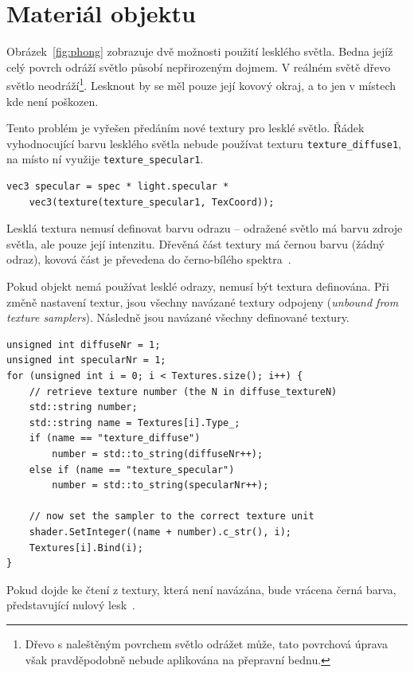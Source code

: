 \documentclass[thesis=M,czech]{FITthesis}[2019/12/23]
\begin{document}
\section{Materiál objektu}

Obrázek~\ref{fig:phong} zobrazuje dvě možnosti použití lesklého světla. Bedna jejíž celý povrch odráží světlo působí nepřirozeným dojmem. V reálném světě dřevo světlo neodráží\footnote{Dřevo s naleštěným povrchem světlo odrážet může, tato povrchová úprava však pravděpodobně nebude aplikována na přepravní bednu.}. Lesknout by se měl pouze její kovový okraj, a to jen v místech kde není poškozen.

Tento problém je vyřešen předáním nové textury pro lesklé světlo. Řádek vyhodnocující barvu lesklého světla nebude používat texturu \texttt{texture\_diffuse1}, na místo ní využije \texttt{texture\_specular1}.

\begin{verbatim}
vec3 specular = spec * light.specular * 
    vec3(texture(texture_specular1, TexCoord));
\end{verbatim}

Lesklá textura nemusí definovat barvu odrazu -- odražené světlo má barvu zdroje světla, ale pouze její intenzitu. Dřevěná část textury má černou barvu (žádný odraz), kovová část je převedena do černo-bílého spektra~\cite{lopgl_light_maps}.

Pokud objekt nemá používat lesklé odrazy, nemusí být textura definována. Při změně nastavení textur, jsou všechny navázané textury odpojeny (\textit{unbound from texture samplers}). Následně jsou navázané všechny definované textury.

\begin{verbatim}
unsigned int diffuseNr = 1;
unsigned int specularNr = 1;
for (unsigned int i = 0; i < Textures.size(); i++) {
    // retrieve texture number (the N in diffuse_textureN)
    std::string number;
    std::string name = Textures[i].Type_;
    if (name == "texture_diffuse")
        number = std::to_string(diffuseNr++);
    else if (name == "texture_specular")
        number = std::to_string(specularNr++);

    // now set the sampler to the correct texture unit
    shader.SetInteger((name + number).c_str(), i);
    Textures[i].Bind(i);
}
\end{verbatim}

Pokud dojde ke čtení z textury, která není navázána, bude vrácena černá barva, představující nulový lesk~\cite{unbound_texture}.
\end{document}
